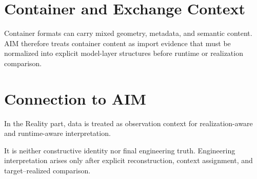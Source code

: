 \section{Container and Exchange Context}

Container formats can carry mixed geometry, metadata, and semantic
content. AIM therefore treats container content as import evidence that
must be normalized into explicit model-layer structures before runtime
or realization comparison.

\section{Connection to AIM}

\begin{summary}
In the Reality part, data is treated as observation context for
realization-aware and runtime-aware interpretation.

It is neither constructive identity nor final engineering truth.
Engineering interpretation arises only after explicit reconstruction,
context assignment, and target--realized comparison.
\end{summary}

